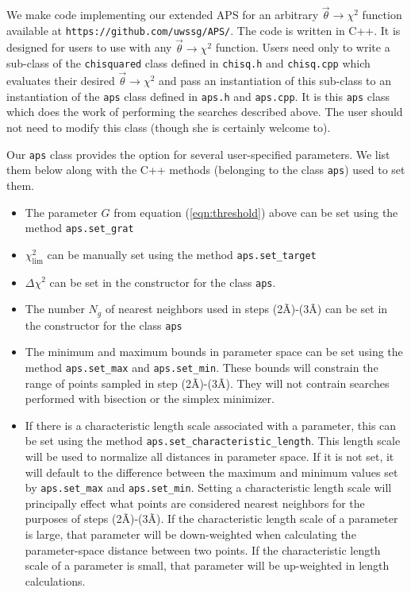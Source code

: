\documentclass[useAMS,usenatbib]{aastex}
\begin{document}
We make code implementing our extended APS for 
an arbitrary $\vec{\theta}\rightarrow\chi^2$
function available at \verb|https://github.com/uwssg/APS/|.
The code is written in C++.  It is designed for users to use
with any $\vec{\theta}\rightarrow\chi^2$ function.  Users need only
to write a sub-class of the \verb|chisquared| class defined in
\verb|chisq.h| and \verb|chisq.cpp| which evaluates their desired
$\vec{\theta}\rightarrow\chi^2$ and pass an instantiation of this
sub-class to an instantiation of the \verb|aps| class defined in
\verb|aps.h| and \verb|aps.cpp|.  It is this \verb|aps| class which
does the work of performing the searches described above.
The user should not need to modify this class (though she is 
certainly welcome to).

Our \verb|aps| class provides the option for several
user-specified parameters.  We list them below along with the C++ 
methods (belonging to the class \verb|aps|) used to set them.

\begin{itemize}
\item The parameter $G$ from equation (\ref{eqn:threshold}) 
above can be set using the method
\verb|aps.set_grat|
\\
\item $\chi^2_\text{lim}$ can be manually set using the 
method \verb|aps.set_target|
\\
\item $\Delta \chi^2$ can be set in the constructor for the class \verb|aps|.
\\
\item The number $N_g$ of nearest neighbors used in 
steps (2\~A)-(3\~A) can be set in the constructor
for the class \verb|aps|
\\
\item The minimum and maximum bounds in parameter space can be set using the 
method \verb|aps.set_max| and \verb|aps.set_min|.  These bounds will constrain the range of
points sampled in step (2\~A)-(3\~A).  
They will not contrain searches performed with bisection or the 
simplex minimizer.
\\
\item If there is a characteristic length scale associated with a parameter, this can be set
using the method \verb|aps.set_characteristic_length|.  This length scale will be used to
normalize all distances in parameter space.  If it is not set, it will default to the
difference between the maximum and minimum values set by \verb|aps.set_max| and
\verb|aps.set_min|.  Setting a characteristic length scale will principally
effect what points are considered nearest neighbors for the purposes of steps
(2\~A)-(3\~A).
If the characteristic length scale of a parameter is large, that parameter will
be down-weighted when calculating the parameter-space distance between two points.
If the characteristic length scale of a parameter is small, that parameter will
be up-weighted in length calculations.
\end{itemize}
\end{document}
